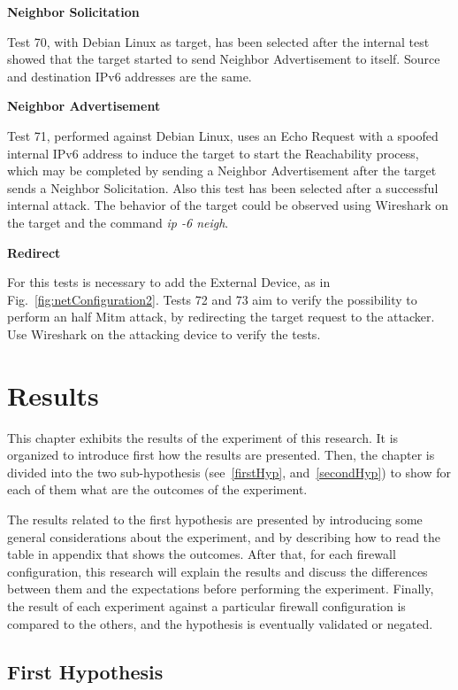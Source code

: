 \documentclass[12pt]{article}
\begin{document}
\textbf{Neighbor Solicitation}

Test 70, with Debian Linux as target, has been selected after the internal test showed that the target started to send Neighbor Advertisement to itself. Source and destination IPv6 addresses are the same.

\textbf{Neighbor Advertisement}

Test 71, performed against Debian Linux, uses an Echo Request with a spoofed internal IPv6 address to induce the target to start the Reachability process, which may be completed by sending a Neighbor Advertisement after the target sends a Neighbor Solicitation. Also this test has been selected after a successful internal attack. The behavior of the target could be observed using Wireshark on the target and the command \textit{ip -6 neigh}.

\textbf{Redirect}

For this tests is necessary to add the External Device, as in Fig.~\ref{fig:netConfiguration2}. Tests 72 and 73 aim to verify the possibility to perform an half Mitm attack, by redirecting the target request to the attacker. Use Wireshark on the attacking device to verify the tests.

\pagebreak

\section{Results}
\label{sec:6}


This chapter exhibits the results of the experiment of this research. It is organized to introduce first how the results are presented. Then, the chapter is divided into the two sub-hypothesis (see~\ref{firstHyp}, and~\ref{secondHyp}) to show for each of them what are the outcomes of the experiment.

The results related to the first hypothesis are presented by introducing some general considerations about the experiment, and by describing how to read the table in appendix that shows the outcomes. After that, for each firewall configuration, this research will explain the results and discuss the differences between them and the expectations before performing the experiment. Finally, the result of each experiment against a particular firewall configuration is compared to the others, and the hypothesis is eventually validated or negated.

\subsection{First Hypothesis}
\label{resultsFirstHypothesis}
\end{document}
